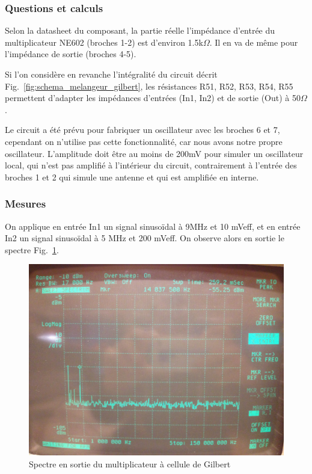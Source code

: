 \documentclass{article}
\begin{document}
\subsubsection{Questions et calculs}


Selon la datasheet du composant, la partie réelle l'impédance d'entrée du multiplicateur NE602 (broches 1-2) est d'environ 1.5k$\Omega$. Il en va de même pour l'impédance de sortie (broches 4-5).

Si l'on considère en revanche l'intégralité du circuit décrit Fig.~\ref{fig:schema_melangeur_gilbert}, les résistances R51, R52, R53, R54, R55 permettent d'adapter les impédances d'entrées (In1, In2) et de sortie (Out) à 50$\Omega$.


Le circuit a été prévu pour fabriquer un oscillateur avec les broches 6 et 7, cependant on n'utilise pas cette fonctionnalité, car nous avons notre propre oscillateur. L'amplitude doit être au moins de 200mV pour simuler un oscillateur local, qui n'est pas amplifié à l'intérieur du circuit, contrairement à l'entrée des broches 1 et 2 qui simule une antenne et qui est amplifiée en interne.

\subsubsection{Mesures}


On applique en entrée In1 un signal sinusoïdal à 9MHz et 10 mVeff, et en entrée In2 un signal sinusoïdal à 5 MHz et 200 mVeff. On observe alors en sortie le spectre Fig.~\ref{fig:gilbert_spectre}.

\begin{figure}[h]
	\centering
	\includegraphics[width=0.7\linewidth]{8_3_1.jpg}
	\caption{Spectre en sortie du multiplicateur à cellule de Gilbert}
	\label{fig:gilbert_spectre}
\end{figure}
\end{document}
